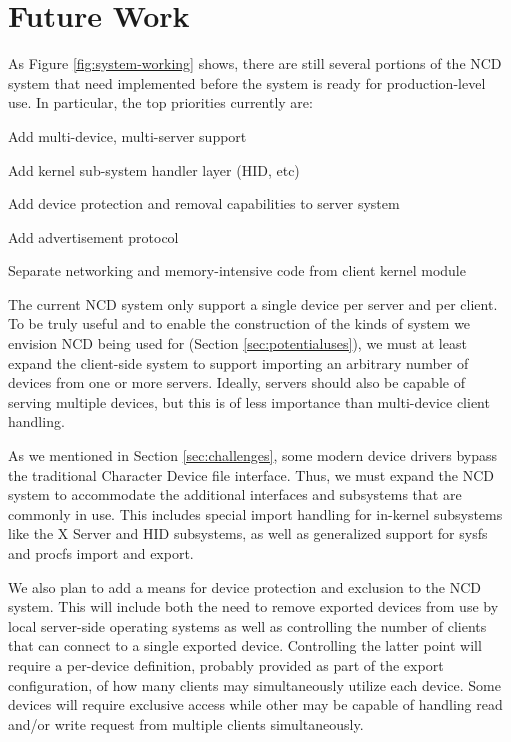 \documentclass[11pt,twocolumn]{article}
\newenvironment{packed_item}{
\begin{itemize}
  \setlength{\itemsep}{1pt}
  \setlength{\parskip}{0pt}
  \setlength{\parsep}{0pt}
}{\end{itemize}}
\begin{document}
\section{Future Work}
\label{sec:futurework}

As Figure \ref{fig:system-working} shows, there are still several
portions of the NCD system that need implemented before the system is
ready for production-level use. In particular, the top priorities
currently are:

\begin{packed_item}
\item Add multi-device, multi-server support
\item Add kernel sub-system handler layer (HID, etc)
\item Add device protection and removal capabilities to server system
\item Add advertisement protocol
\item Separate networking and memory-intensive code from client kernel module
\end{packed_item}

The current NCD system only support a single device per server and per
client. To be truly useful and to enable the construction of the
kinds of system we envision NCD being used for (Section
\ref{sec:potentialuses}), we must at least
expand the client-side
system to support importing an arbitrary number of devices from one
or more servers. Ideally, servers should also be capable of serving
multiple devices, but this is of less importance than multi-device
client handling.

As we mentioned in Section \ref{sec:challenges}, some modern device
drivers bypass the traditional Character Device file interface. Thus, we
must expand the NCD system to accommodate the additional interfaces and
subsystems that are commonly in use. This includes special import
handling for in-kernel subsystems like the X Server and HID
subsystems, as well as generalized support for sysfs and procfs import
and export.

We also plan to add a means for device protection and exclusion to
the NCD system. This will include both the need to remove exported
devices from use by local server-side operating systems as well as controlling
the number of clients that can connect to a single exported
device. Controlling the latter point will require a per-device
definition, probably provided as part of the export configuration, of
how many clients may simultaneously utilize each device. Some devices will
require exclusive access while other may be capable of handling read
and/or write request from multiple clients simultaneously. 
\end{document}
